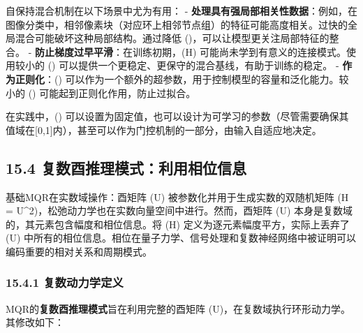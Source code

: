 \documentclass[
  12pt,
]{article}
\begin{document}
自保持混合机制在以下场景中尤为有用： -
\textbf{处理具有强局部相关性数据}：例如，在图像分类中，相邻像素块（对应环上相邻节点组）的特征可能高度相关。过快的全局混合可能破坏这种局部结构。通过降低
(\beta)，可以让模型更关注局部特征的整合。 -
\textbf{防止梯度过早平滑}：在训练初期，(H)
可能尚未学到有意义的连接模式。使用较小的 (\beta)
可以提供一个更稳定、更保守的混合基线，有助于训练的稳定。 -
\textbf{作为正则化}：(\beta)
可以作为一个额外的超参数，用于控制模型的容量和泛化能力。较小的 (\beta)
可能起到正则化作用，防止过拟合。

在实践中，(\beta)
可以设置为固定值，也可以设计为可学习的参数（尽管需要确保其值域在{[}0,1{]}内），甚至可以作为门控机制的一部分，由输入自适应地决定。

\hypertarget{ux590dux6570ux9149ux63a8ux7406ux6a21ux5f0fux5229ux7528ux76f8ux4f4dux4fe1ux606f}{%
\subsection{15.4
复数酉推理模式：利用相位信息}\label{ux590dux6570ux9149ux63a8ux7406ux6a21ux5f0fux5229ux7528ux76f8ux4f4dux4fe1ux606f}}

基础MQR在实数域操作：酉矩阵 (U) 被参数化并用于生成实数的双随机矩阵 (H =
\textbar U\textbar\^{}2)，松弛动力学也在实数向量空间中进行。然而，酉矩阵
(U) 本身是复数域的，其元素包含幅度和相位信息。将 (H)
定义为逐元素幅度平方，实际上丢弃了 (U)
中所有的相位信息。相位在量子力学、信号处理和复数神经网络中被证明可以编码重要的相对关系和周期模式。

\hypertarget{ux590dux6570ux52a8ux529bux5b66ux5b9aux4e49}{%
\subsubsection{15.4.1
复数动力学定义}\label{ux590dux6570ux52a8ux529bux5b66ux5b9aux4e49}}

MQR的\textbf{复数酉推理模式}旨在利用完整的酉矩阵
(U)，在复数域执行环形动力学。其修改如下：
\end{document}
